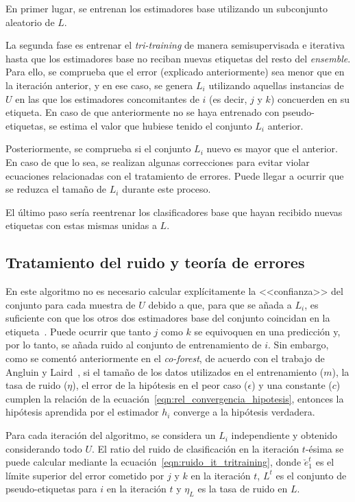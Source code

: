 En primer lugar, se entrenan los estimadores base utilizando un subconjunto aleatorio de $L$.

La segunda fase es entrenar el \textit{tri-training} de manera semisupervisada e iterativa hasta que los estimadores base no reciban nuevas etiquetas del resto del \textit{ensemble}. Para ello, se comprueba que el error (explicado anteriormente) sea menor que en la iteración anterior, y en ese caso, se genera $L_i$ utilizando aquellas instancias de $U$ en las que los estimadores concomitantes de $i$ (es decir, $j$ y $k$) concuerden en su etiqueta. En caso de que anteriormente no se haya entrenado con pseudo-etiquetas, se estima el valor que hubiese tenido el conjunto $L_i$ anterior.

Posteriormente, se comprueba si el conjunto $L_i$ nuevo es mayor que el anterior. En caso de que lo sea, se realizan algunas correcciones para evitar violar ecuaciones relacionadas con el tratamiento de errores. Puede llegar a ocurrir que se reduzca el tamaño de $L_i$ durante este proceso.

El último paso sería reentrenar los clasificadores base que hayan recibido nuevas etiquetas con estas mismas unidas a $L$.

\subsection{Tratamiento del ruido y teoría de errores}

En este algoritmo no es necesario calcular explícitamente la <<confianza>> del conjunto para cada muestra de $U$ debido a que, para que se añada a $L_i$, es suficiente con que los otros dos estimadores base del conjunto coincidan en la etiqueta~\cite{tritraining2005@original}. Puede ocurrir que tanto $j$ como $k$ se equivoquen en una predicción y, por lo tanto, se añada ruido al conjunto de entrenamiento de $i$. Sin embargo, como se comentó anteriormente en el \textit{co-forest}, de acuerdo con el trabajo de Angluin y Laird~\cite{noisyExamplesCoforest1988Dana}, si el tamaño de los datos utilizados en el entrenamiento ($m$), la tasa de ruido ($\eta$), el error de la hipótesis en el peor caso ($\epsilon$) y una constante ($c$) cumplen la relación de la ecuación~\ref{eqn:rel_convergencia_hipotesis}, entonces la hipótesis aprendida por el estimador $h_{i}$ converge a la hipótesis verdadera.

Para cada iteración del algoritmo, se considera un $L_i$ independiente y obtenido considerando todo $U$. El ratio del ruido de clasificación en la iteración $t$-ésima se puede calcular mediante la ecuación~\ref{eqn:ruido_it_tritraining}, donde $\check{e}_{1}^{t}$ es el límite superior del error cometido por $j$ y $k$ en la iteración $t$, $L^t$ es el conjunto de pseudo-etiquetas para $i$ en la iteración $t$ y $\eta_L$ es la tasa de ruido en $L$.

